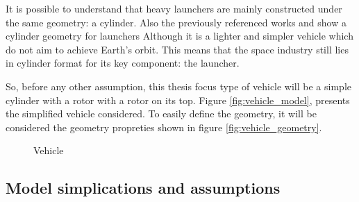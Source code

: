 It is possible to understand that heavy launchers are mainly constructed under the same geometry: a cylinder. Also the previously referenced works \cite{maurer_project_nodate} and \cite{riegler_daedalus_2018} show a cylinder geometry for launchers Although it is a lighter and simpler vehicle which do not aim to achieve Earth's orbit. This means that the space industry still lies in cylinder format for its key component: the launcher.

So, before any other assumption, this thesis focus type of vehicle will be a simple cylinder with a rotor with a rotor on its top. Figure \ref{fig:vehicle_model}, presents the simplified vehicle considered. To easily define the geometry, it will be considered the geometry propreties shown in figure \ref{fig:vehicle_geometry}.


\begin{figure}[!htb]
    \centering
    \hfill
    \caption{Vehicle}
    \label{fig:vehicle}
\end{figure}


\subsection{Model simplications and assumptions}
\label{section:model_assumptions}

